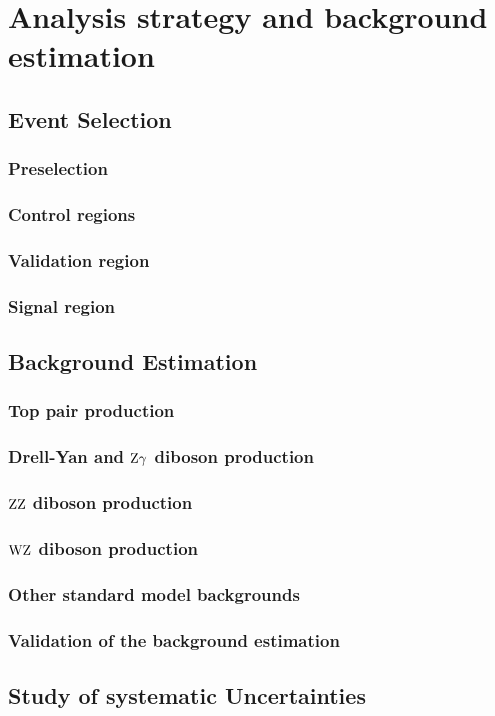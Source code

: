 \chapter{Analysis strategy and background estimation}\label{chap:analysis}
\section{Event Selection}
\subsection{Preselection}
\subsection{Control regions}
\subsection{Validation region}
\subsection{Signal region}\label{sec:SRSelection}
\section{Background Estimation}
\subsection{Top pair production}\label{sec:ttbar}
\subsection{Drell-Yan and $\mathrm{Z}\gamma$ diboson production}
\subsection{$\mathrm{Z}\mathrm{Z}$ diboson production}
\subsection{$\mathrm{W}\mathrm{Z}$ diboson production}
\subsection{Other standard model backgrounds}
\subsection{Validation of the background estimation}
\section{Study of systematic Uncertainties}
